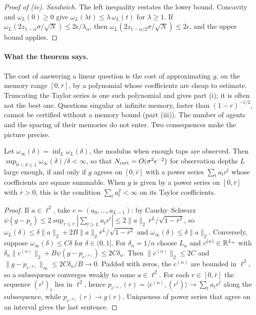 \begin{proof}[Proof of (iv)]
\emph{Sandwich.} The left inequality restates the lower bound. Concavity and $\omega_L(0)\ge0$ give $\omega_L(\lambda t)\le\lambda\,\omega_L(t)$ for $\lambda\ge1$. If $\omega_L(2z_{1-\alpha}\sigma/\sqrt N)\le2\epsilon/\lambda_\alpha$, then $\omega_L(2z_{1-\alpha/2}\sigma/\sqrt N)\le2\epsilon$, and the upper bound applies.
\end{proof}

\paragraph{What the theorem says.} The cost of answering a linear question is the cost of approximating $g$, on the memory range $[0,\bar r]$, by a polynomial whose coefficients are cheap to estimate. Truncating the Taylor series is one such polynomial and gives part (i); it is often not the best one. Questions singular at infinite memory, faster than $(1-r)^{-1/2}$, cannot be certified without a memory bound (part (iii)). The number of agents and the spacing of their memories do not enter. Two consequences make the picture precise.

\begin{proposition}\label{prop:parametric}
Let $\omega_\infty(\delta)=\inf_L\omega_L(\delta)$, the modulus when enough taps are observed. Then $\sup_{0<\delta\le1}\omega_\infty(\delta)/\delta<\infty$, so that $N_{\rm cert}=O(\sigma^2\epsilon^{-2})$ for observation depths $L$ large enough, if and only if $g$ agrees on $[0,\bar r]$ with a power series $\sum_ta_tr^t$ whose coefficients are square summable. When $g$ is given by a power series on $[0,\bar r]$ with $\bar r>0$, this is the condition $\sum_ta_t^2<\infty$ on its Taylor coefficients. \hfill\Proved
\end{proposition}

\begin{proof}
If $a\in\ell^2$, take $c=(a_0,\dots,a_{L-1})$: by Cauchy--Schwarz $\psi(g-p_c)\le2\sup_{r\le\bar r}|\sum_{t\ge L}a_tr^t|\le2\|a\|_2\,\bar r^L/\sqrt{1-\bar r^2}$, so $\omega_L(\delta)\le\delta\|a\|_2+2B\|a\|_2\bar r^L/\sqrt{1-\bar r^2}$ and $\omega_\infty(\delta)\le\delta\|a\|_2$. Conversely, suppose $\omega_\infty(\delta)\le C\delta$ for $\delta\in(0,1]$. For $\delta_n=1/n$ choose $L_n$ and $c^{(n)}\in\mathbb{R}^{L_n}$ with $\delta_n\|c^{(n)}\|_2+B\psi(g-p_{c^{(n)}})\le2C\delta_n$. Then $\|c^{(n)}\|_2\le2C$ and $\|g-p_{c^{(n)}}\|_\infty\le2C\delta_n/B\to0$. Padded with zeros, the $c^{(n)}$ are bounded in $\ell^2$, so a subsequence converges weakly to some $a\in\ell^2$. For each $r\in[0,\bar r]$ the sequence $(r^t)_t$ lies in $\ell^2$, hence $p_{c^{(n)}}(r)=\langle c^{(n)},(r^t)\rangle\to\sum_ta_tr^t$ along the subsequence, while $p_{c^{(n)}}(r)\to g(r)$. Uniqueness of power series that agree on an interval gives the last sentence.
\end{proof}

